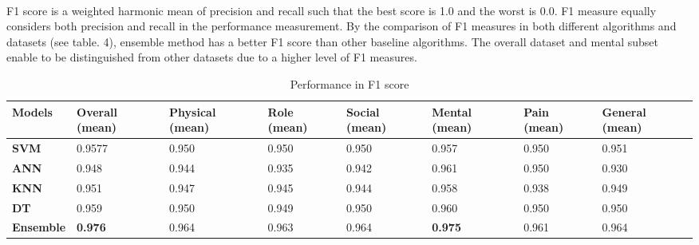 \documentclass[runningheads]{llncs}
\begin{document}
\paragraph{}
F1 score is a weighted harmonic mean of precision and recall such that the best score is 1.0 and the worst is 0.0. F1 measure equally considers both precision and recall in the performance measurement. By the comparison of F1 measures in both different algorithms and datasets (see table. 4), ensemble method has a better F1 score than other baseline algorithms. The overall dataset and mental subset enable to be distinguished from other datasets due to a higher level of F1 measures.
\begin{table}[h]
\begin{tabular}{|C{2cm}|C{1.5cm}|C{1.5cm}|C{1.5cm}|C{1.5cm}|C{1.5cm}|C{1.5cm}|C{1.5cm}|}
\hline
{} 
{\color[HTML]{333333} \textbf{Models}} & {\color[HTML]{333333} \textbf{Overall (mean)}} & {\color[HTML]{333333} \textbf{Physical (mean)}} & {\color[HTML]{333333} \textbf{Role (mean)}} &{\color[HTML]{333333} \textbf{Social (mean)}} & {\color[HTML]{333333} \textbf{Mental (mean)}} & {\color[HTML]{333333} \textbf{Pain (mean)}} & {\color[HTML]{333333} \textbf{General (mean)}} \\ \hline
{} 
\textbf{SVM} & 0.9577  & 0.950 & 0.950  & 0.950  & 0.957  & 0.950 & 0.951 \\ \hline
{} 
\textbf{ANN} & 0.948  & 0.944  & 0.935  & 0.942 & 0.961 & 0.950 & 0.930 \\ \hline
{} 
\textbf{KNN} & 0.951  & 0.947 & 0.945 & 0.944 & 0.958 & 0.938 & 0.949 \\ \hline
{} 
\textbf{DT} & 0.959 & 0.950  & 0.949 & 0.950  & 0.960  & 0.950 & 0.950  \\ \hline
{} 
\textbf{Ensemble}  & \textbf{0.976}  & 0.964  & 0.963  & 0.964 & \textbf{0.975} & 0.961 & 0.964  \\ \hline
\end{tabular}
\caption{Performance in F1 score}
\label{F1}
\end{table}
%
%
\end{document}
